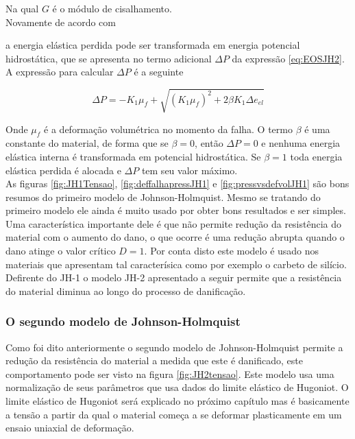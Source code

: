 Na qual $ G $ é o módulo de cisalhamento. \\

Novamente de acordo com \cite{holmquist_johnson_2002}

a  energia elástica perdida pode ser transformada em energia potencial hidrostática, que se apresenta no termo adicional $ \Delta P $ da expressão \ref{eq:EOSJH2}. A expressão para calcular $\Delta P$ é a seguinte

\begin{equation} \label{eq:JHEOSDeltaP}
	\Delta P = -K_1 \mu_f + \sqrt{(K_1 \mu_f)^2 + 2 \beta K_1 \Delta e_{el}}
\end{equation} 

Onde $ \mu_f $ é a deformação volumétrica no momento da falha. O termo $ \beta $ é uma constante do material, de forma que se $ \beta = 0 $, então $ \Delta P = 0 $ e nenhuma energia elástica interna é transformada em potencial hidrostática. Se $ \beta = 1 $ toda energia elástica perdida é alocada e $ \Delta P $ tem seu valor máximo. \\


As figuras \ref{fig:JH1Tensao}, \ref{fig:deffalhapressJH1} e \ref{fig:pressvsdefvolJH1} são bons resumos do primeiro modelo de Johnson-Holmquist. Mesmo se tratando do primeiro modelo ele ainda é muito usado por obter bons resultados e ser simples. Uma característica importante dele é que não permite redução da resistência do material com o aumento do dano, o que ocorre é uma redução abrupta quando o dano atinge o valor crítico $ D = 1 $. Por conta disto este modelo é usado nos materiais que apresentam tal caracterísica como por exemplo o carbeto de silício. Defirente do JH-1 o modelo JH-2 apresentado a seguir permite que a resistência do material diminua ao longo do processo de danificação. \par

\subsubsection{O segundo modelo de Johnson-Holmquist}

Como foi dito anteriormente o segundo modelo de Johnson-Holmquist permite a redução da resistência do material a medida que este é danificado, este comportamento pode ser visto na figura \ref{fig:JH2tensao}. Este modelo usa uma normalização de seus parâmetros que usa dados do limite elástico de Hugoniot. O limite elástico de Hugoniot será explicado no próximo capítulo mas é basicamente a tensão a partir da qual o material começa a se deformar plasticamente em um ensaio uniaxial de deformação.

